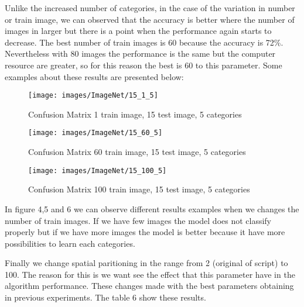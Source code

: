 \documentclass[10pt,twocolumn,letterpaper]{article}
\begin{document}
Unlike the increased number of categories, in the case of the variation in number or train image, we can observed that the accuracy is better where the number of images in larger but there is a point when the performance again starts to decrease. The best number of train images is 60 because the accuracy is 72\%. Nevertheless with 80 images the performance is the same but the computer resource are greater, so for this reason the best is 60 to this parameter. Some examples about these results are presented below: 



\begin{figure}[H]  \texttt{[image: images/ImageNet/15\_1\_5]}\caption{Confusion Matrix 1 train image, 15 test image, 5 categories}\label{Comp}\end{figure}

\begin{figure}[H]  \texttt{[image: images/ImageNet/15\_60\_5]}\caption{Confusion Matrix 60 train image, 15 test image, 5 categories}\label{Comp}\end{figure}

\begin{figure}[H]  \texttt{[image: images/ImageNet/15\_100\_5]}\caption{Confusion Matrix 100 train image, 15 test image, 5 categories}\label{Comp}\end{figure}

In figure 4,5 and 6 we can observe different results examples when we changes the number of train images. If we have few images the model does not classify properly but if we have more images the model is better because it have more possibilities to learn each categories. 


Finally we change spatial paritioning in the range from 2 (original of script) to 100. The reason for this is we want see the effect that this parameter have in the algorithm performance. These changes made with the best parameters obtaining in previous experiments. The table 6 show these results. 
\end{document}
